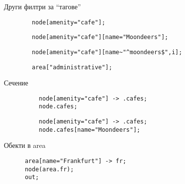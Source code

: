\documentclass[10pt]{beamer}
\begin{document}
  \begin{frame}[fragile]{Други филтри за ``тагове''}
    \begin{lstwrap}\begin{lstlisting}
        node[amenity="cafe"];
    \end{lstlisting}\end{lstwrap}

    \begin{lstwrap}\begin{lstlisting}
        node[amenity="cafe"][name="Moondeers"];
    \end{lstlisting}\end{lstwrap}

    \begin{lstwrap}\begin{lstlisting}
        node[amenity="cafe"][name~"^moondeers$",i];
    \end{lstlisting}\end{lstwrap}

    \begin{lstwrap}\begin{lstlisting}
        area["administrative"];
    \end{lstlisting}\end{lstwrap}
  \end{frame}

  \begin{frame}[fragile]{Сечение}
      \begin{lstwrap}\begin{lstlisting}
          node[amenity="cafe"] -> .cafes;
          node.cafes;
      \end{lstlisting}\end{lstwrap}
      \begin{lstwrap}\begin{lstlisting}
          node[amenity="cafe"] -> .cafes;
          node.cafes[name="Moondeers"];
      \end{lstlisting}\end{lstwrap}
  \end{frame}

  \begin{frame}[fragile]{Обекти в area}
    \begin{lstwrap}\begin{lstlisting}
      area[name="Frankfurt"] -> fr;
      node(area.fr);
      out;
    \end{lstlisting}\end{lstwrap}
  \end{frame}
\end{document}
